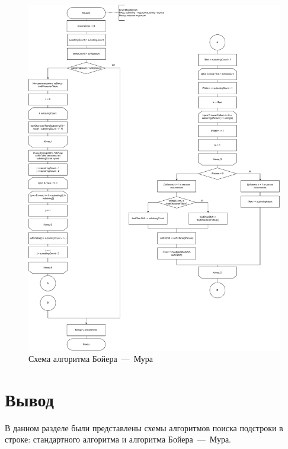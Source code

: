 \begin{figure}[h]
	\centering
	\includegraphics[width=1\linewidth]{img/boyermoor.pdf}
	\caption{Схема алгоритма Бойера~---~Мура}
	\label{img:boyermoor}
\end{figure}

\clearpage

\section*{Вывод}
В данном разделе были представлены схемы алгоритмов поиска подстроки в строке: стандартного алгоритма и алгоритма Бойера~---~Мура.
